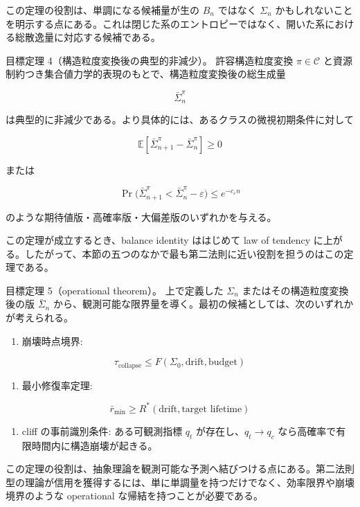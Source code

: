 \documentclass[12pt,a4paper]{article}
\begin{document}
この定理の役割は、単調になる候補量が生の \(B_{n}\) ではなく \(\Sigma_{n}\) かもしれないことを明示する点にある。これは閉じた系のエントロピーではなく、開いた系における総散逸量に対応する候補である。

目標定理 4（構造粒度変換後の典型的非減少）。 許容構造粒度変換 \(\pi \in \mathcal C\) と資源制約つき集合値力学的表現のもとで、構造粒度変換後の総生成量

\[
\bar \Sigma_{n}^\pi
\]

は典型的に非減少である。より具体的には、あるクラスの微視初期条件に対して

\[
\mathbb E[\bar \Sigma_{n+1}^\pi - \bar \Sigma_{n}^\pi] \ge 0
\]

または

\[
\Pr\!\bigl(\bar \Sigma_{n+1}^\pi < \bar \Sigma_{n}^\pi - \varepsilon\bigr) \le e^{-c_\varepsilon n}
\]

のような期待値版・高確率版・大偏差版のいずれかを与える。

この定理が成立するとき、balance identity ははじめて law of tendency に上がる。したがって、本節の五つのなかで最も第二法則に近い役割を担うのはこの定理である。

目標定理 5（operational theorem）。 上で定義した \(\Sigma_{n}\) またはその構造粒度変換後の版 \(\bar \Sigma_{n}\) から、観測可能な限界量を導く。最初の候補としては、次のいずれかが考えられる。

\begin{enumerate}
\def\labelenumi{\arabic{enumi}.}
\tightlist
\item
  崩壊時点境界:
\end{enumerate}

\[
\tau_{\mathrm{collapse}} \le F(\Sigma_0,\text{drift},\text{budget})
\]

\begin{enumerate}
\def\labelenumi{\arabic{enumi}.}
\setcounter{enumi}{1}
\tightlist
\item
  最小修復率定理:
\end{enumerate}

\[
\bar r_{\min} \ge R^*(\text{drift},\text{target lifetime})
\]

\begin{enumerate}
\def\labelenumi{\arabic{enumi}.}
\setcounter{enumi}{2}
\tightlist
\item
  cliff の事前識別条件: ある可観測指標 \(q_{t}\) が存在し、\(q_{t} \to q_{c}\) なら高確率で有限時間内に構造崩壊が起きる。
\end{enumerate}

この定理の役割は、抽象理論を観測可能な予測へ結びつける点にある。第二法則型の理論が信用を獲得するには、単に単調量を持つだけでなく、効率限界や崩壊境界のような operational な帰結を持つことが必要である。
\end{document}
